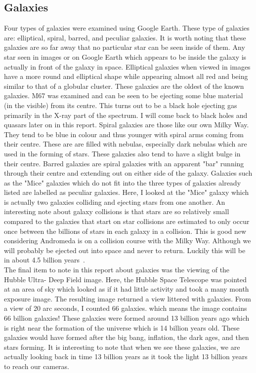 \documentclass{article}
\begin{document}
\subsection{Galaxies}
Four types of galaxies were examined using Google Earth. These type of galaxies are:
elliptical, spiral, barred, and peculiar galaxies. It is worth noting that these
galaxies are so far away that no particular star can be seen inside of them. Any star
seen in images or on Google Earth which appears to be inside the galaxy is actually in
front of the galaxy in space. Elliptical galaxies when viewed in images have a more
round and elliptical shape while appearing almost all red and being similar to that
of a globular cluster. These galaxies are the oldest of the known galaxies. M67 was
examined and can be seen to be ejecting some blue material (in the visible) from 
its centre. This turns out to be a black hole ejecting gas primarily in the X-ray
part of the spectrum. I will come back to black holes and quasars later on in this report.
Spiral galaxies are those like our own Milky Way. They tend to be blue in colour and thus
younger with spiral arms coming from their centre. These are are filled with nebulas,
especially dark nebulas which are used in the forming of stars. These galaxies
also tend to have a slight bulge in their centre. Barred galaxies are spiral galaxies
with an apparent "bar" running through their centre and extending out on either side of
the galaxy. Galaxies such as the "Mice" galaxies which do not fit into the three types
of galaxies already listed are labelled as peculiar galaxies. Here, I looked at the "Mice"
galaxy which is actually two galaxies colliding and ejecting stars from one another. 
An interesting note about galaxy collisions is that stars are so relatively small compared
to the galaxies that start on star collisions are estimated to only occur once between
the billions of stars in each galaxy in a collision. This is good new considering Andromeda
is on a collision course with the Milky Way. Although we will probably be ejected out into 
space and never to return. Luckily this will be in about 4.5 billion years~\cite{Col:2007}.\\

The final item to note in this report about galaxies was the viewing of the Hubble Ultra-
Deep Field image. Here, the Hubble Space Telescope was pointed at an area of sky which
looked as if it had little activity and took a many month exposure image. The resulting
image returned a view littered with galaxies. From a view of 20 arc seconds, I counted 66
galaxies. which means the image contains 66 billion galaxies! These galaxies were formed
around 13 billion years ago which is right near the formation of the universe which
is 14 billion years old. These galaxies would have formed after the big bang, inflation,
the dark ages, and then stars forming. It is interesting to note that when we see these galaxies,
we are actually looking back in time 13 billion years as it took the light 13 billion
years to reach our cameras.
\end{document}

